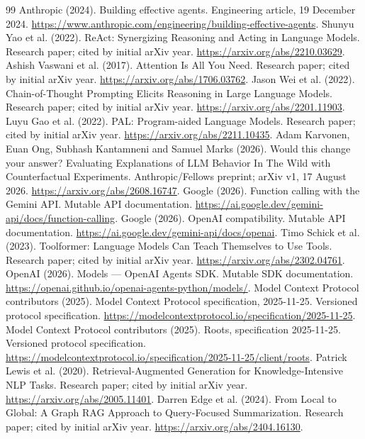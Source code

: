 \begin{thebibliography}{99}
Anthropic (2024). Building effective agents. Engineering article, 19 December 2024. \url{https://www.anthropic.com/engineering/building-effective-agents}.
Shunyu Yao et al. (2022). ReAct: Synergizing Reasoning and Acting in Language Models. Research paper; cited by initial arXiv year. \url{https://arxiv.org/abs/2210.03629}.
Ashish Vaswani et al. (2017). Attention Is All You Need. Research paper; cited by initial arXiv year. \url{https://arxiv.org/abs/1706.03762}.
Jason Wei et al. (2022). Chain-of-Thought Prompting Elicits Reasoning in Large Language Models. Research paper; cited by initial arXiv year. \url{https://arxiv.org/abs/2201.11903}.
Luyu Gao et al. (2022). PAL: Program-aided Language Models. Research paper; cited by initial arXiv year. \url{https://arxiv.org/abs/2211.10435}.
Adam Karvonen, Euan Ong, Subhash Kantamneni and Samuel Marks (2026). Would this change your answer? Evaluating Explanations of LLM Behavior In The Wild with Counterfactual Experiments. Anthropic/Fellows preprint; arXiv v1, 17 August 2026. \url{https://arxiv.org/abs/2608.16747}.
Google (2026). Function calling with the Gemini API. Mutable API documentation. \url{https://ai.google.dev/gemini-api/docs/function-calling}.
Google (2026). OpenAI compatibility. Mutable API documentation. \url{https://ai.google.dev/gemini-api/docs/openai}.
Timo Schick et al. (2023). Toolformer: Language Models Can Teach Themselves to Use Tools. Research paper; cited by initial arXiv year. \url{https://arxiv.org/abs/2302.04761}.
OpenAI (2026). Models — OpenAI Agents SDK. Mutable SDK documentation. \url{https://openai.github.io/openai-agents-python/models/}.
Model Context Protocol contributors (2025). Model Context Protocol specification, 2025-11-25. Versioned protocol specification. \url{https://modelcontextprotocol.io/specification/2025-11-25}.
Model Context Protocol contributors (2025). Roots, specification 2025-11-25. Versioned protocol specification. \url{https://modelcontextprotocol.io/specification/2025-11-25/client/roots}.
Patrick Lewis et al. (2020). Retrieval-Augmented Generation for Knowledge-Intensive NLP Tasks. Research paper; cited by initial arXiv year. \url{https://arxiv.org/abs/2005.11401}.
Darren Edge et al. (2024). From Local to Global: A Graph RAG Approach to Query-Focused Summarization. Research paper; cited by initial arXiv year. \url{https://arxiv.org/abs/2404.16130}.

\end{thebibliography}
